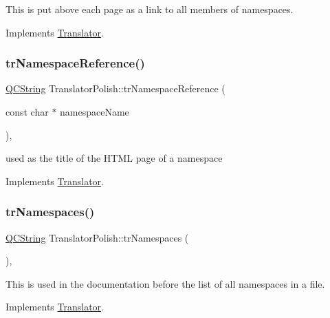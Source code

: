 This is put above each page as a link to all members of namespaces. 

Implements \mbox{\hyperlink{class_translator}{Translator}}.

\mbox{\label{class_translator_polish_ad6178061269bdf4a4f9c948e1e5c560c}} 
\subsubsection{\texorpdfstring{trNamespaceReference()}{trNamespaceReference()}}
{\footnotesize\ttfamily \mbox{\hyperlink{class_q_c_string}{Q\+C\+String}} Translator\+Polish\+::tr\+Namespace\+Reference (\begin{DoxyParamCaption}\item[{const char $\ast$}]{namespace\+Name }\end{DoxyParamCaption})\hspace{0.3cm}{\ttfamily [inline]}, {\ttfamily [virtual]}}

used as the title of the H\+T\+ML page of a namespace 

Implements \mbox{\hyperlink{class_translator}{Translator}}.

\mbox{\label{class_translator_polish_ac4d9d7b38ecf2340250c574e3982b4c1}} 
\subsubsection{\texorpdfstring{trNamespaces()}{trNamespaces()}}
{\footnotesize\ttfamily \mbox{\hyperlink{class_q_c_string}{Q\+C\+String}} Translator\+Polish\+::tr\+Namespaces (\begin{DoxyParamCaption}{ }\end{DoxyParamCaption})\hspace{0.3cm}{\ttfamily [inline]}, {\ttfamily [virtual]}}

This is used in the documentation before the list of all namespaces in a file. 

Implements \mbox{\hyperlink{class_translator}{Translator}}.

\mbox{\label{class_translator_polish_a78724c66bcd03325a32eeb56f2791307}} 
